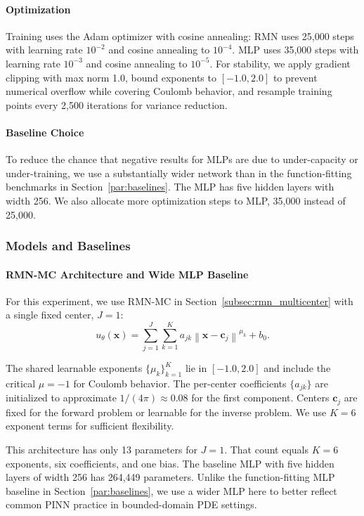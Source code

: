 \documentclass[twoside,11pt]{article}
\newcommand{\bx}{\bm{x}}
\newcommand{\bc}{\bm{c}}
\newcommand{\norm}[1]{\left\|#1\right\|}
\begin{document}
\paragraph{Optimization}

Training uses the Adam optimizer with cosine annealing:
RMN uses 25,000 steps with learning rate $10^{-2}$ and cosine annealing to $10^{-4}$. MLP uses 35,000 steps with learning rate $10^{-3}$ and cosine annealing to $10^{-5}$.
For stability, we apply gradient clipping with max norm 1.0, bound exponents to $[-1.0, 2.0]$ to prevent numerical overflow while covering Coulomb behavior, and resample training points every 2,500 iterations for variance reduction.

\paragraph{Baseline Choice} To reduce the chance that negative results for MLPs are due to under-capacity or under-training, we use a substantially wider network than in the function-fitting benchmarks in Section~\ref{par:baselines}. The MLP has five hidden layers with width 256. We also allocate more optimization steps to MLP, 35,000 instead of 25,000.

\subsubsection{Models and Baselines}

\paragraph{RMN-MC Architecture and Wide MLP Baseline}

For this experiment, we use RMN-MC in Section~\ref{subsec:rmn_multicenter} with a single fixed center, $J=1$:
\begin{equation}
	u_\theta(\bx) = \sum_{j=1}^{J} \sum_{k=1}^{K} a_{jk} \norm{\bx - \bc_j}^{\mu_k} + b_0.
\end{equation}

The shared learnable exponents $\{\mu_k\}_{k=1}^K$ lie in $[-1.0, 2.0]$ and include the critical $\mu = -1$ for Coulomb behavior. The per-center coefficients $\{a_{jk}\}$ are initialized to approximate $1/(4\pi) \approx 0.08$ for the first component. Centers $\bc_j$ are fixed for the forward problem or learnable for the inverse problem. We use $K = 6$ exponent terms for sufficient flexibility.

This architecture has only 13 parameters for $J=1$. That count equals $K=6$ exponents, six coefficients, and one bias. The baseline MLP with five hidden layers of width 256 has 264,449 parameters. Unlike the function-fitting MLP baseline in Section~\ref{par:baselines}, we use a wider MLP here to better reflect common PINN practice in bounded-domain PDE settings.
\end{document}
